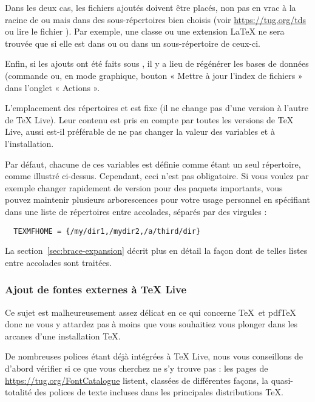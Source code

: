 \documentclass[german, english, french]{article}
\renewcommand{\TL}{\TeX{} Live\xspace}%
\begin{document}
Dans les deux cas, les fichiers ajoutés doivent être placés, non pas en vrac
à la racine de  ou  mais dans des
sous-répertoires bien choisis (voir \url{https://tug.org/tds} ou lire le fichier
). Par exemple, une classe ou une extension \LaTeX{} ne sera
trouvée que si elle est dans  ou
 ou dans un sous-répertoire de ceux-ci.

Enfin, si les ajouts ont été faits sous , il y a lieu de
régénérer les bases de données  (commande  ou,
en mode graphique, bouton « Mettre à jour l'index de fichiers » dans l'onglet
« Actions ».

L'emplacement des répertoires  et  est
fixe (il ne change pas d'une version à l'autre de \TL{}). Leur contenu est pris
en compte par toutes les versions de \TL{}, aussi est-il préférable de ne pas
changer la valeur des variables  et 
à l'installation.

Par défaut, chacune de ces variables est définie comme étant un seul répertoire,
comme illustré ci-dessus. Cependant, ceci n'est pas obligatoire.  Si vous voulez
par exemple changer rapidement de version pour des paquets importants, vous
pouvez maintenir plusieurs arborescences pour votre usage personnel en
spécifiant dans  une liste de répertoires entre accolades,
séparés par des virgules :

\begin{verbatim}
  TEXMFHOME = {/my/dir1,/mydir2,/a/third/dir}
\end{verbatim}

La section~\ref{sec:brace-expansion} décrit plus en détail la façon dont de
telles listes entre accolades sont traitées.


\subsubsection{Ajout de fontes externes à \protect\TL{}}

Ce sujet est malheureusement assez délicat en ce qui concerne \TeX\ et pdf\TeX{}
donc ne vous y attardez pas à moins que vous souhaitiez vous plonger dans les
arcanes d'une installation \TeX{}.

De nombreuses polices étant déjà intégrées à \TL, nous vous conseillons de
d'abord vérifier si ce que vous cherchez ne s'y trouve pas : les pages de
\url{https://tug.org/FontCatalogue} listent, classées de différentes façons, la
quasi-totalité des polices de texte incluses dans les principales distributions
\TeX.
\end{document}
